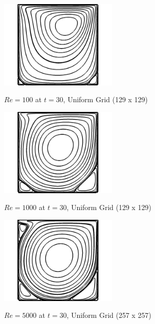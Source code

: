 \documentclass[twocolumn,10pt]{asme2ej}
\begin{document}
\begin{figure}[htb!]
\begin{center}
\includegraphics[width=0.5\textwidth]{figure/Re100.png}
\caption{$Re = 100$ at $t = 30$, Uniform Grid (129 x 129)}
\label{Re100}
\vspace{5mm} %
\includegraphics[width=0.5\textwidth]{figure/Re1000.png}
\caption{$Re = 1000$ at $t = 30$, Uniform Grid (129 x 129)}
\label{Re1000}
\vspace{5mm} %
\includegraphics[width=0.5\textwidth]{figure/Re5000.png}
\caption{$Re = 5000$ at $t = 30$, Uniform Grid (257 x 257)}
\label{Re5000}
\end{center}
\end{figure}

\clearpage




\hfill \break
\end{document}

